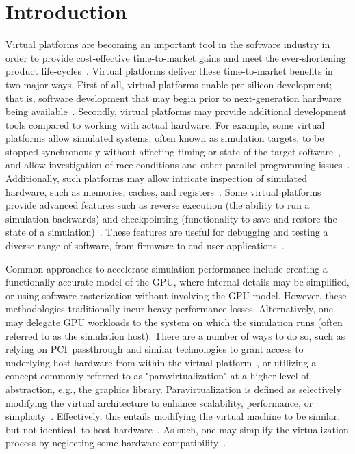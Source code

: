 
\section{Introduction}
\label{sec:introduction}
Virtual platforms are becoming an important tool in the software industry in order to provide cost-effective time-to-market gains and meet the ever-shortening product life-cycles~\cite{journals:magnusson:2002, journals:yi:2006, publications:leupers:2010, publications:aarno:2014}.
Virtual platforms deliver these time-to-market benefits in two major ways.
First of all, virtual platforms enable pre-silicon development; that is, software development that may begin prior to next-generation hardware being available~.
Secondly, virtual platforms may provide additional development tools compared to working with actual hardware.
For example, some virtual platforms allow simulated systems, often known as simulation targets, to be stopped synchronously without affecting timing or state of the target software~, and allow investigation of race conditions and other parallel programming issues~.
Additionally, such platforms may allow intricate inspection of simulated hardware, such as memories, caches, and registers~.
Some virtual platforms provide advanced features such as reverse execution (the ability to run a simulation backwards) and checkpointing (functionality to save and restore the state of a simulation)~.
These features are useful for debugging and testing a diverse range of software, from firmware to end-user applications~.

Common approaches to accelerate simulation performance include creating a functionally accurate model of the GPU, where internal details may be simplified, or using software rasterization without involving the GPU model.
However, these methodologies traditionally incur heavy performance losses.
Alternatively, one may delegate GPU workloads to the system on which the simulation runs (often referred to as the simulation host).
There are a number of ways to do so, such as relying on PCI~passthrough and similar technologies to grant access to underlying host hardware from within the virtual platform~, or utilizing a concept commonly referred to as "paravirtualization" at a higher level of abstraction, e.g., the graphics library.
Paravirtualization is defined as selectively modifying the virtual architecture to enhance scalability, performance, or simplicity~.
Effectively, this entails modifying the virtual machine to be similar, but not identical, to host hardware~.
As such, one may simplify the virtualization process by neglecting some hardware compatibility~.

